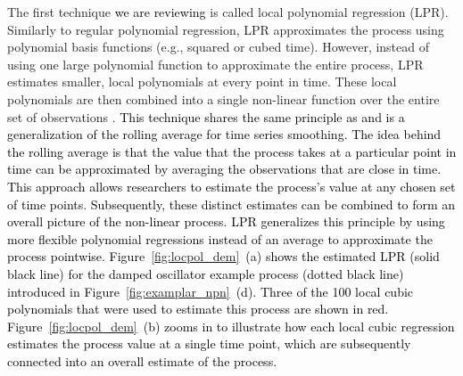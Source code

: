 \documentclass[man, floatsintext]{apa7}
\begin{document}
The first technique \textcolor{black}{we are reviewing} is called local
polynomial regression (LPR). Similarly to regular polynomial regression, LPR
approximates the process using polynomial basis functions (e.g., squared or
cubed time). However, instead of using one large polynomial function to
approximate the entire process, LPR estimates smaller, local polynomials at
every point in time. These local polynomials are then combined into a single
non-linear function over the entire set of observations
\parencite{fan_adaptive_1995, ruppert_multivariate_1994, fan_local_2018}.
\textcolor{black}{This technique shares the same principle as and is a
  generalization of the rolling average for time series smoothing.
  The idea behind the rolling average is that the value that the process
  takes at a particular point in time can be approximated by averaging
  the observations that are close in time. This approach allows researchers to
  estimate
  the process's value at any chosen set of time points. Subsequently, these
  distinct
  estimates
  can be combined to form an overall picture of the non-linear
  process.
  LPR generalizes this principle by using more
  flexible polynomial regressions instead of an average to approximate the
  process pointwise.
  Figure~\ref{fig:locpol_dem}~(a) shows the estimated LPR (solid black line)
  for the damped oscillator example process (dotted black line) introduced in
  Figure~\ref{fig:examplar_npn}~(d). Three of the 100 local cubic
  polynomials that were used to estimate this process are shown in red.
  Figure~\ref{fig:locpol_dem}~(b) zooms in to
  illustrate how each local cubic regression estimates the process value at a
  single time point, which are subsequently connected into an overall estimate
  of the process.}

\begin{sidewaysfigure*}[htbp]
  \caption{Demonstration of a local polynomial regression}
  \label{fig:locpol_dem}
\end{sidewaysfigure*}
\end{document}
